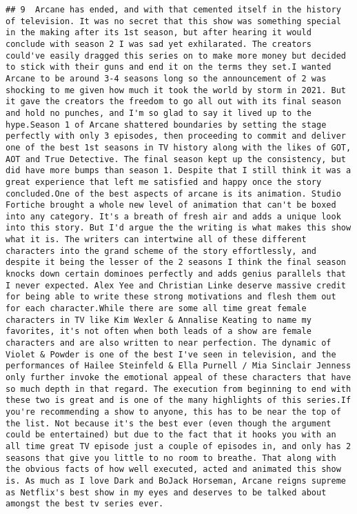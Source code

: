 \documentclass[
]{article}
\begin{document}
\begin{verbatim}
## 9  Arcane has ended, and with that cemented itself in the history of television. It was no secret that this show was something special in the making after its 1st season, but after hearing it would conclude with season 2 I was sad yet exhilarated. The creators could've easily dragged this series on to make more money but decided to stick with their guns and end it on the terms they set.I wanted Arcane to be around 3-4 seasons long so the announcement of 2 was shocking to me given how much it took the world by storm in 2021. But it gave the creators the freedom to go all out with its final season and hold no punches, and I'm so glad to say it lived up to the hype.Season 1 of Arcane shattered boundaries by setting the stage perfectly with only 3 episodes, then proceeding to commit and deliver one of the best 1st seasons in TV history along with the likes of GOT, AOT and True Detective. The final season kept up the consistency, but did have more bumps than season 1. Despite that I still think it was a great experience that left me satisfied and happy once the story concluded.One of the best aspects of arcane is its animation. Studio Fortiche brought a whole new level of animation that can't be boxed into any category. It's a breath of fresh air and adds a unique look into this story. But I'd argue the the writing is what makes this show what it is. The writers can intertwine all of these different characters into the grand scheme of the story effortlessly, and despite it being the lesser of the 2 seasons I think the final season knocks down certain dominoes perfectly and adds genius parallels that I never expected. Alex Yee and Christian Linke deserve massive credit for being able to write these strong motivations and flesh them out for each character.While there are some all time great female characters in TV like Kim Wexler & Annalise Keating to name my favorites, it's not often when both leads of a show are female characters and are also written to near perfection. The dynamic of Violet & Powder is one of the best I've seen in television, and the performances of Hailee Steinfeld & Ella Purnell / Mia Sinclair Jenness only further invoke the emotional appeal of these characters that have so much depth in that regard. The execution from beginning to end with these two is great and is one of the many highlights of this series.If you're recommending a show to anyone, this has to be near the top of the list. Not because it's the best ever (even though the argument could be entertained) but due to the fact that it hooks you with an all time great TV episode just a couple of episodes in, and only has 2 seasons that give you little to no room to breathe. That along with the obvious facts of how well executed, acted and animated this show is. As much as I love Dark and BoJack Horseman, Arcane reigns supreme as Netflix's best show in my eyes and deserves to be talked about amongst the best tv series ever.

\end{verbatim}
\end{document}
